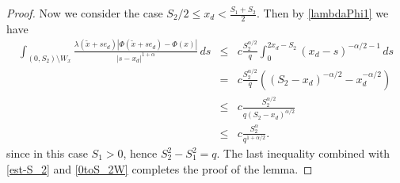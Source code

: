 \documentclass[10pt,a4paper]{amsart}
\begin{document}
\begin{proof}
Now we consider  the case $S_2/2\le x_d< \frac{S_1+S_2}2$.   Then by \eqref{lambdaPhi1}    we have
\begin{eqnarray*}
\int_{(0, S_2) \setminus W_x} 
\frac{\lambda(\tilde{x} + s e_d) |\varPhi(\tilde{x} + s e_d) - \varPhi(x)|}{|s - x_d|^{1 + \alpha}} \, ds 
&\le&  c\frac{S^{\alpha/2}_2}{q }\int_{0}^{ 2x_d-S_2} (x_d - s)^{-\alpha/2-1}\, ds \nonumber\\
&=& c\frac{S^{\alpha/2}_2}{q }( (S_2 - x_d)^{-\alpha/2}- x_d^{-\alpha/2}) \nonumber\\
&\le& c\frac{S_2^{\alpha/2}}{q (S_2 - x_d)^{\alpha/2}} \nonumber\\
&\le& c\frac{S^{\alpha}_2}{q^{1+\alpha/2} }. 
\end{eqnarray*} 
since in this case 
$S_1>0$, hence  $S^2_2-S^2_1=q$.
The last inequality combined with \eqref{est-S_2} and \eqref{0toS_2W}  completes the proof of the lemma.
\end{proof}    
\end{document}
